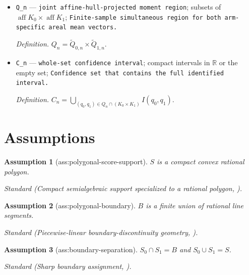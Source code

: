 \documentclass{article}
\newtheorem{assumption}{Assumption}
\begin{document}
\begin{itemize}
  \par\smallskip\noindent\emph{Definition.} \(\widetilde Q_{d,n}=\{q\in\operatorname{aff}K_d:\|q-\widetilde m_d\|_2\leq\rho_{d,n}\}\).
  \item \texttt{Q\_\allowbreak{}n} --- \texttt{joint affine-\allowbreak{}hull-\allowbreak{}projected moment region}; subsets of \(\operatorname{aff}K_0\times\operatorname{aff}K_1\); \texttt{Finite-\allowbreak{}sample simultaneous region for both arm-\allowbreak{}specific areal mean vectors.}
  \par\smallskip\noindent\emph{Definition.} \(Q_n=\widetilde Q_{0,n}\times\widetilde Q_{1,n}\).
  \item \texttt{C\_\allowbreak{}n} --- \texttt{whole-\allowbreak{}set confidence interval}; compact intervals in \(\mathbb R\) or the empty set; \texttt{Confidence set that contains the full identified interval.}
  \par\smallskip\noindent\emph{Definition.} \(C_n=\bigcup_{(q_0,q_1)\in Q_n\cap(K_0\times K_1)}I(q_0,q_1)\).
\end{itemize}

\section{Assumptions}

\begin{assumption}[ass:polygonal-score-support]\label{ass:polygonal-score-support}
\(S\) is a compact convex rational polygon.
\par\smallskip\noindent\emph{Standard} (Compact semialgebraic support specialized to a rational polygon, \cite{MulaNouy2024MomentSOSOT}).
\end{assumption}

\begin{assumption}[ass:polygonal-boundary]\label{ass:polygonal-boundary}
\(B\) is a finite union of rational line segments.
\par\smallskip\noindent\emph{Standard} (Piecewise-linear boundary-discontinuity geometry, \cite{CattaneoTitiunikYu2025LocationBoundary}).
\end{assumption}

\begin{assumption}[ass:boundary-separation]\label{ass:boundary-separation}
\(S_0\cap S_1=B\) and \(S_0\cup S_1=S\).
\par\smallskip\noindent\emph{Standard} (Sharp boundary assignment, \cite{CattaneoTitiunikYu2025LocationBoundary}).
\end{assumption}
\end{document}
